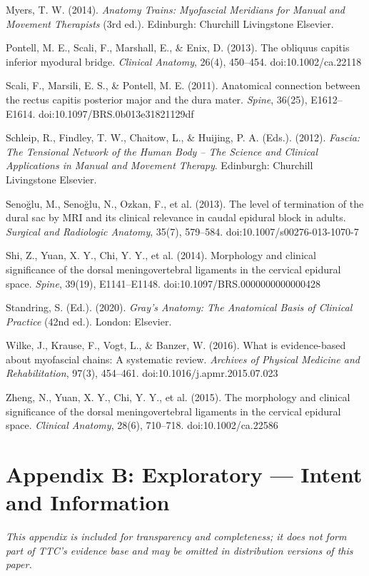 \documentclass[11pt,letterpaper]{article}
\begin{document}
Myers, T. W. (2014). \textit{Anatomy Trains: Myofascial Meridians for Manual and Movement Therapists} (3rd ed.). Edinburgh: Churchill Livingstone Elsevier.


Pontell, M. E., Scali, F., Marshall, E., \& Enix, D. (2013). The obliquus capitis inferior myodural bridge. \textit{Clinical Anatomy}, 26(4), 450–454. doi:10.1002/ca.22118


Scali, F., Marsili, E. S., \& Pontell, M. E. (2011). Anatomical connection between the rectus capitis posterior major and the dura mater. \textit{Spine}, 36(25), E1612–E1614. doi:10.1097/BRS.0b013e31821129df


Schleip, R., Findley, T. W., Chaitow, L., \& Huijing, P. A. (Eds.). (2012). \textit{Fascia: The Tensional Network of the Human Body – The Science and Clinical Applications in Manual and Movement Therapy}. Edinburgh: Churchill Livingstone Elsevier.


Senoğlu, M., Senoğlu, N., Ozkan, F., et al. (2013). The level of termination of the dural sac by MRI and its clinical relevance in caudal epidural block in adults. \textit{Surgical and Radiologic Anatomy}, 35(7), 579–584. doi:10.1007/s00276-013-1070-7


Shi, Z., Yuan, X. Y., Chi, Y. Y., et al. (2014). Morphology and clinical significance of the dorsal meningovertebral ligaments in the cervical epidural space. \textit{Spine}, 39(19), E1141–E1148. doi:10.1097/BRS.0000000000000428


Standring, S. (Ed.). (2020). \textit{Gray's Anatomy: The Anatomical Basis of Clinical Practice} (42nd ed.). London: Elsevier.


Wilke, J., Krause, F., Vogt, L., \& Banzer, W. (2016). What is evidence-based about myofascial chains: A systematic review. \textit{Archives of Physical Medicine and Rehabilitation}, 97(3), 454–461. doi:10.1016/j.apmr.2015.07.023


Zheng, N., Yuan, X. Y., Chi, Y. Y., et al. (2015). The morphology and clinical significance of the dorsal meningovertebral ligaments in the cervical epidural space. \textit{Clinical Anatomy}, 28(6), 710–718. doi:10.1002/ca.22586


\section{Appendix B: Exploratory — Intent and Information}

\textit{This appendix is included for transparency and completeness; it does not form part of TTC's evidence base and may be omitted in distribution versions of this paper.}
\end{document}
